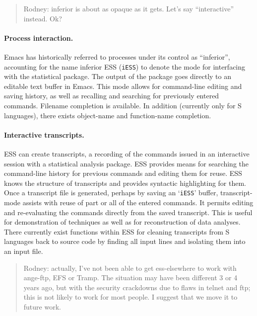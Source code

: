 \documentclass{article}
\newcommand*{\XLispStat}{\textsc{XLispStat}}
\newcommand*{\Stata}{\textsc{Stata}}
\newcommand{\stexttt}[1]{{\small\texttt{#1}}}
\newcommand{\file}[1]{`\stexttt{#1}'}
\begin{document}
\begin{quote}
 Rodney:  inferior is about as opaque as it gets.  Let's say
``interactive'' instead.  Ok?
\end{quote}

\paragraph{Process interaction.}
Emacs has historically referred to processes under its control as
``inferior'', accounting for the name inferior ESS (\stexttt{iESS}) to
denote the mode for interfacing with the statistical package.  The
output of the package goes directly to an editable text buffer in Emacs.
This mode allows for command-line editing and saving history, as well as
recalling and searching for previously entered commands.  Filename
completion is available.  In addition (currently only for S languages),
there exists object-name and function-name completion.

\paragraph{Interactive transcripts.}
ESS can create transcripts, a recording of the commands issued in an
interactive session with a statistical analysis package.
ESS provides means for searching
the command-line history for previous commands and editing them for
reuse.  ESS knows the structure of transcripts and provides
syntactic highlighting for them.
Once a transcript file is generated, perhaps by saving an \file{iESS}
buffer, transcript-mode assists with reuse of part or all of the
entered commands.  It permits editing and re-evaluating the commands
directly from the saved transcript.  This is useful for
demonstration of techniques as well as for reconstruction of data
analyses.  There currently exist functions within ESS for cleaning
transcripts from S languages back to source code by finding all input
lines and isolating them into an input file.

\begin{quote}
 Rodney:  actually, I've not been able to get ess-elsewhere to work with
ange-ftp, EFS or Tramp.  The situation may have been different
3 or 4 years ago, but with the security crackdowns due to
flaws in telnet and ftp; this is not likely to work for most
people.  I suggest that we move it to future work.
\end{quote}
\end{document}
